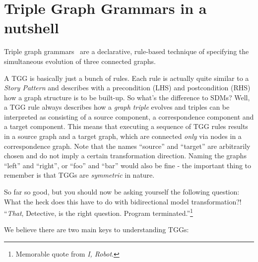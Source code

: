 \newpage
\section{Triple Graph Grammars in a nutshell}
\genHeader

Triple graph grammars~\cite{tgg:schuerr_94,sk2008,Klar2010} are a declarative, rule-based technique of specifying the simultaneous evolution of three connected
graphs. 

A TGG is basically just a bunch of rules. Each rule is actually quite similar to a \emph{Story Pattern} and describes with a
precondition (LHS) and postcondition (RHS) how a graph structure is to be built-up. So what's the difference to SDMs? Well, a TGG rule always describes how a
\emph{graph triple} evolves and triples can be interpreted as consisting of a source component, a correspondence component and a target component. This means
that executing a sequence of TGG rules results in a source graph and a target graph, which are connected \emph{only} via nodes in a correspondence graph. Note
that the names ``source'' and ``target'' are arbitrarily chosen and do not imply a certain transformation direction. Naming the graphs ``left'' and ``right'',
or ``foo'' and ``bar'' would also be fine - the important thing to remember is that TGGs are \emph{symmetric} in nature.

So far so good, but you should now be asking yourself the following question: What the {\huge heck} does this have to do with bidirectional model
transformation?!  ``\emph{That}, Detective, is the right question. Program terminated.''\footnote{Memorable quote from \emph{I, Robot}.}

We believe there are two main keys to understanding TGGs:

